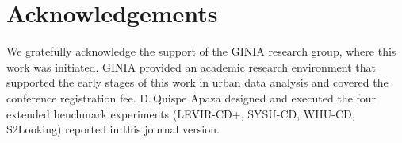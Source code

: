 \documentclass[runningheads]{llncs}
\newcommand{\journal}[1]{{\color{orange}#1}}
\begin{document}
\section*{Acknowledgements}

We gratefully acknowledge the support of the GINIA research group, where this
work was initiated. GINIA provided an academic research environment that
supported the early stages of this work in urban data analysis and covered the
conference registration fee.
\journal{D.\,Quispe Apaza designed and executed the four extended benchmark experiments (LEVIR-CD+, SYSU-CD, WHU-CD, S2Looking) reported in this journal
version.}



\end{document}
